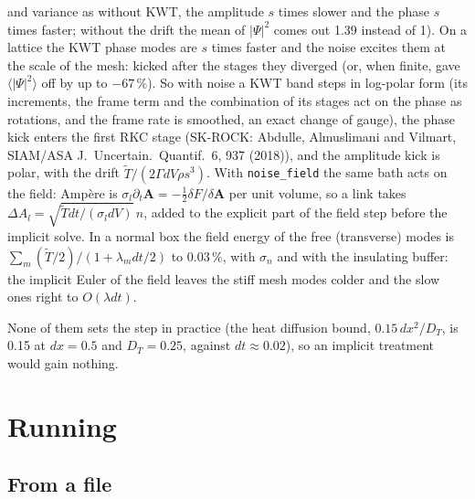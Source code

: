 \documentclass[11pt,a4paper]{article}
\newcommand{\code}[1]{\texttt{#1}}
\begin{document}
\begin{description}
  and variance as without KWT, the amplitude $s$ times slower and the phase $s$ times faster; without the drift the mean of
  $|\Psi|^2$ comes out 1.39 instead of 1). On a lattice the KWT phase modes are $s$ times faster and the noise excites them at
  the scale of the mesh: kicked after the stages they diverged (or, when finite, gave $\langle|\Psi|^2\rangle$ off by up to $-67\,\%$).
  So with noise a KWT band steps in log-polar form (its increments, the frame term and the combination of its stages act on the
  phase as rotations, and the frame rate is smoothed, an exact change of gauge), the phase kick enters the first RKC stage
  (SK-ROCK: Abdulle, Almuslimani and Vilmart, SIAM/ASA J.\ Uncertain.\ Quantif.\ 6, 937 (2018)), and the amplitude kick is
  polar, with the drift $\tilde T/(2\Gamma dV\rho s^3)$. With \code{noise\_field} the same bath acts on the field: Amp\`ere is
  $\sigma_l\partial_t\mathbf A = -\tfrac12\delta F/\delta\mathbf A$ per unit volume, so a link takes
  $\Delta A_l = \sqrt{\tilde T dt/(\sigma_l dV)}\,n$, added to the explicit part of the field step before the implicit solve. In a
  normal box the field energy of the free (transverse) modes is $\sum_m(\tilde T/2)/(1+\lambda_m dt/2)$ to 0.03\,\%, with
  $\sigma_n$ and with the insulating buffer: the implicit Euler of the field leaves the stiff mesh modes colder and the slow ones
  right to $O(\lambda dt)$.
\end{description}
None of them sets the step in practice (the heat diffusion bound, $0.15\,dx^2/D_T$, is 0.15 at $dx = 0.5$ and $D_T =
0.25$, against $dt \approx 0.02$), so an implicit treatment would gain nothing.

\section{Running}\label{sec:running}

\subsection{From a file}
\end{document}

